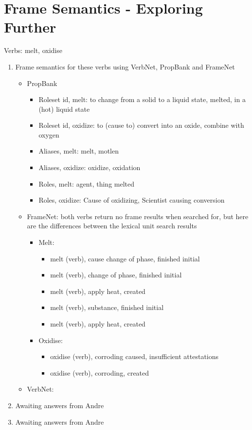 \documentclass[12pt]{report}
\begin{document}
\section{Frame Semantics - Exploring Further}
Verbs: melt, oxidise
\begin{enumerate}
  \item Frame semantics for these verbs using VerbNet, PropBank and FrameNet
  \begin{itemize}
    \item PropBank
    \begin{itemize}
      \item Roleset id, melt: to change from a solid to a liquid state, melted,
      in a (hot) liquid state
      \item Roleset id, oxidize: to (cause to) convert into an oxide, combine
      with oxygen
      \item Aliases, melt: melt, motlen
      \item Aliases, oxidize: oxidize, oxidation
      \item Roles, melt: agent, thing melted
      \item Roles, oxidize: Cause of oxidizing, Scientist causing conversion
    \end{itemize}
    \item FrameNet: both verbs return no frame results when searched for, but
    here are the differences between the lexical unit search results
    \begin{itemize}
      \item Melt:
      \begin{itemize}
        \item melt (verb), cause change of phase, finished initial
        \item melt (verb), change of phase, finished initial
        \item melt (verb), apply heat, created
        \item melt (verb), substance, finished initial
        \item melt (verb), apply heat, created
      \end{itemize}
      \item Oxidise:
      \begin{itemize}
        \item oxidise (verb), corroding caused, insufficient attestations
        \item oxidise (verb), corroding, created
      \end{itemize}
    \end{itemize}
    \item VerbNet:
  \end{itemize}
  \item Awaiting answers from Andre
  \item Awaiting answers from Andre
\end{enumerate}
\end{document}
